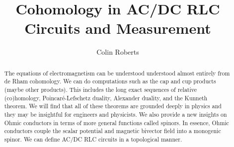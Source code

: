 \documentclass{article}
\title{Cohomology in AC/DC RLC Circuits and Measurement}
\author{Colin Roberts}
\affil{autoparallel.xyz}
\begin{document}
\maketitle
\begin{abstract}
The equations of electromagnetism can be understood understood almost entirely from de Rham cohomology. 
We can do computations such as the cap and cup products (maybe other products). 
This includes the long exact sequences of relative (co)homology, Poincar\'e-Lefschetz duality, Alexander duality, and the Kunneth theorem. 
We will find that all of these theorems are grounded deeply in physics and they may be insightful for engineers and physicists. 
We also provide a new insights on Ohmic conductors in terms of more general functions called spinors. 
In essence, Ohmic conductors couple the scalar potential and magnetic bivector field into a monogenic spinor.
We can define AC/DC RLC circuits in a topological manner.
\end{abstract}


\newpage
\end{document}
